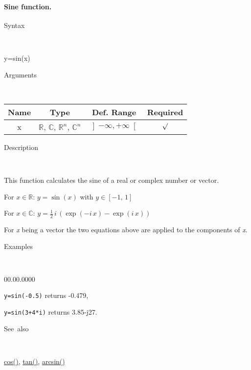 \paragraph{\label{par:Sine}Sine function.}

\begin{description}
\item [Syntax]~
\end{description}
y=sin(x)

\begin{description}
\item [Arguments]~
\end{description}
\begin{tabular}{|c|c|c|c|}
\hline 
Name&
Type&
Def. Range&
Required\tabularnewline
\hline
\hline 
x&
$\mathbb{R}$, $\mathbb{C}$, $\mathbb{R}^{n}$, $\mathbb{C}^{n}$&
$\left]-\infty,+\infty\right[$&
$\surd$\tabularnewline
\hline
\end{tabular}

\begin{description}
\item [Description]~
\end{description}
This function calculates the sine of a real or complex number or vector.

\medskip{}
For $x\in\mathbb{R}$: $y=\sin\left(x\right)$ with $y\in\left[-1,\,1\right]$
\medskip{}

For $x\in\mathbb{C}$: $y=\frac{1}{2}\, i\,\left(\exp\left(-i\, x\right)-\exp\left(i\, x\right)\right)$
\medskip{}

For \textit{x} being a vector the two equations above are
applied to the components of \textit{x}.

\begin{description}
\item [Examples]~
\end{description}
\begin{lyxlist}{00.00.0000}
\item [\texttt{y=sin(-0.5)}]returns -0.479,
\item [\texttt{y=sin(3+4{*}i)}]returns 3.85-j27.
\end{lyxlist}
\begin{description}
\item [See~also]~
\end{description}
\textcolor{blue}{\hyperlink{cos}{cos()}}\textcolor{black}{,} \textcolor{blue}{\hyperlink{tan}{tan()}}\textcolor{black}{,}
\textcolor{blue}{\hyperlink{arcsin}{arcsin()}}


\newpage
